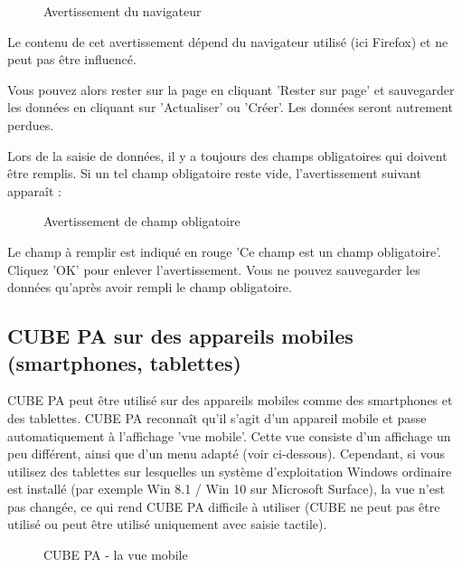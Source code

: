 \begin{figure}[H]
\caption{Avertissement du navigateur}
\end{figure}
\begin{small}
Le contenu de cet avertissement dépend du navigateur utilisé (ici Firefox) et ne peut pas être influencé.
\end{small}

\vspace{\baselineskip}

Vous pouvez alors rester sur la page en cliquant 'Rester sur page' et sauvegarder les données en cliquant sur 'Actualiser' ou 'Créer'. Les données seront autrement perdues.

\vspace{\baselineskip}

Lors de la saisie de données, il y a toujours des champs obligatoires qui doivent être remplis. Si un tel champ obligatoire reste vide, l'avertissement suivant apparaît :

\begin{figure}[H]
\caption{Avertissement de champ obligatoire}
\end{figure}

Le champ à remplir est indiqué en rouge 'Ce champ est un champ obligatoire'. Cliquez 'OK' pour enlever l'avertissement. Vous ne pouvez sauvegarder les données qu'après avoir rempli le champ obligatoire. 


\subsection{CUBE PA sur des appareils mobiles (smartphones, tablettes)}

CUBE PA peut être utilisé sur des appareils mobiles comme des smartphones et des tablettes. CUBE PA reconnaît qu'il s'agit d'un appareil mobile et passe automatiquement à l'affichage 'vue mobile'. Cette vue consiste d'un affichage un peu différent, ainsi que d'un menu adapté (voir ci-dessous). Cependant, si vous utilisez des tablettes sur lesquelles un système d'exploitation Windows ordinaire est installé (par exemple Win 8.1 / Win 10 sur Microsoft Surface), la vue n'est pas changée, ce qui rend CUBE PA difficile à utiliser (CUBE ne peut pas être utilisé ou peut être utilisé uniquement avec saisie tactile).


\begin{figure}[H]
\caption{CUBE PA - la vue mobile }
\end{figure}

